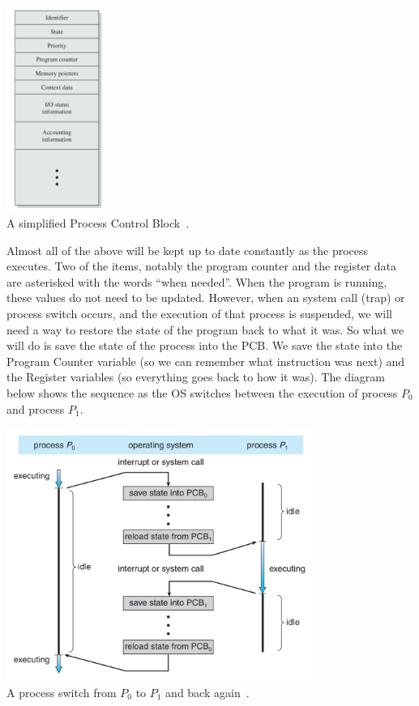 \begin{center}
\includegraphics[width=0.25\textwidth]{images/pcb.png}\\
A simplified Process Control Block~\cite{osi}.
\end{center}

Almost all of the above will be kept up to date constantly as the process executes.  Two of the items, notably the program counter and the register data are asterisked with the words ``when needed''. When the program is running, these values do not need to be updated. However, when an system call (trap) or process switch occurs, and the execution of that process is suspended, we will need a way to restore the state of the program back to what it was. So what we will do is save the state of the process into the PCB. We save the state into the Program Counter variable (so we can remember what instruction was next) and the Register variables (so everything goes back to how it was). The diagram below shows the sequence as the OS switches between the execution of process $P_{0}$ and process $P_{1}$.

\begin{center}
\includegraphics[width=0.75\textwidth]{images/process-switch.png}\\
A process switch from $P_{0}$ to $P_{1}$ and back again~\cite{osc}.
\end{center}

